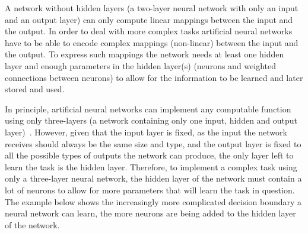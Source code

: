A network without hidden layers (\ie a two-layer neural network with only an input and an output layer) can only compute linear mappings between the input and the output. In order to deal with more complex tasks artificial neural networks have to be able to encode complex mappings (\ie non-linear) between the input and the output. To express such mappings the network needs at least one hidden layer and enough parameters in the hidden layer(s) (\ie neurons and weighted connections between neurons) to allow for the information to be learned and later stored and used. 


In principle, artificial neural networks can implement any computable function using only three-layers (\ie a network containing only one input, hidden and output layer)~\cite{Hornik91}. However, given that the input layer is fixed, as the input the network receives should always be the same size and type, and the output layer is fixed to all the possible types of outputs the network can produce, the only layer left to learn the task is the hidden layer. Therefore, to implement a complex task using only a three-layer neural network, the hidden layer of the network must contain a lot of neurons to allow for more parameters that will learn the task in question. The example below shows the increasingly more complicated decision boundary a neural network can learn, the more neurons are being added to the hidden layer of the network.


